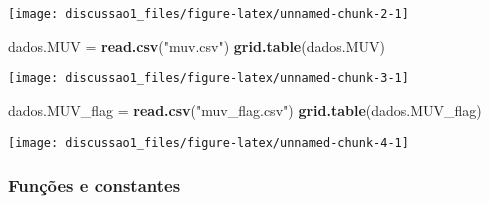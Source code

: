 \documentclass[]{article}
\newenvironment{Shaded}{\begin{snugshade}}{\end{snugshade}}
\newcommand{\KeywordTok}[1]{\textcolor[rgb]{0.13,0.29,0.53}{\textbf{#1}}}
\newcommand{\StringTok}[1]{\textcolor[rgb]{0.31,0.60,0.02}{#1}}
\newcommand{\NormalTok}[1]{#1}
\begin{document}
\begin{flushleft}\texttt{[image: discussao1\_files/figure-latex/unnamed-chunk-2-1]} \end{flushleft}

\begin{Shaded}
\begin{Highlighting}[]
\NormalTok{dados.MUV =}\StringTok{ }\KeywordTok{read.csv}\NormalTok{(}\StringTok{"muv.csv"}\NormalTok{)}
\KeywordTok{grid.table}\NormalTok{(dados.MUV)}
\end{Highlighting}
\end{Shaded}

\begin{flushleft}\texttt{[image: discussao1\_files/figure-latex/unnamed-chunk-3-1]} \end{flushleft}

\begin{Shaded}
\begin{Highlighting}[]
\NormalTok{dados.MUV_flag =}\StringTok{ }\KeywordTok{read.csv}\NormalTok{(}\StringTok{"muv_flag.csv"}\NormalTok{)}
\KeywordTok{grid.table}\NormalTok{(dados.MUV_flag)}
\end{Highlighting}
\end{Shaded}

\begin{flushleft}\texttt{[image: discussao1\_files/figure-latex/unnamed-chunk-4-1]} \end{flushleft}

\subsubsection{Funções e constantes}\label{funcoes-e-constantes}
\end{document}
